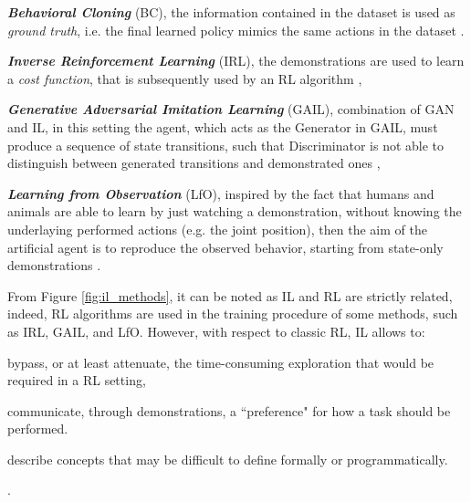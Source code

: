 \begin{itemize*}
    \item \textbf{\textit{Behavioral Cloning}} (BC), the information contained in the dataset is used as \textit{ground truth}, i.e. the final learned policy mimics the same actions in the dataset \cite{}.
    \item \textbf{\textit{Inverse Reinforcement Learning}} (IRL), the demonstrations are used to learn a \textit{cost function}, that is subsequently used by an RL algorithm \cite{},
    \item \textbf{\textit{Generative Adversarial Imitation Learning}} (GAIL), combination of GAN \cite{} and IL, in this setting the agent, which acts as the Generator in GAIL, must produce a sequence of state transitions, such that Discriminator is not able to distinguish between generated transitions and demonstrated ones \cite{},
    \item \textbf{\textit{Learning from Observation}} (LfO), inspired by the fact that humans and animals are able to learn by just watching a demonstration, without knowing the underlaying performed actions (e.g. the joint position), then the aim of the artificial agent is to reproduce the observed behavior, starting from state-only demonstrations \cite{torabi2019recent_advances_lfo}.   
\end{itemize*}

From Figure \ref{fig:il_methods}, it can be noted as IL and RL are strictly related, indeed, RL algorithms are used in the training procedure of some methods, such as IRL, GAIL, and LfO. However, with respect to classic RL, IL allows to: \begin{enumerate*}[label=\textbf{(\arabic*)}]
    \item bypass, or at least attenuate, the time-consuming exploration that would be required in a RL setting, 
    \item communicate, through demonstrations, a ``preference" for how a task should be performed.
    \item describe concepts that may be difficult to define formally or programmatically.
\end{enumerate*}.
